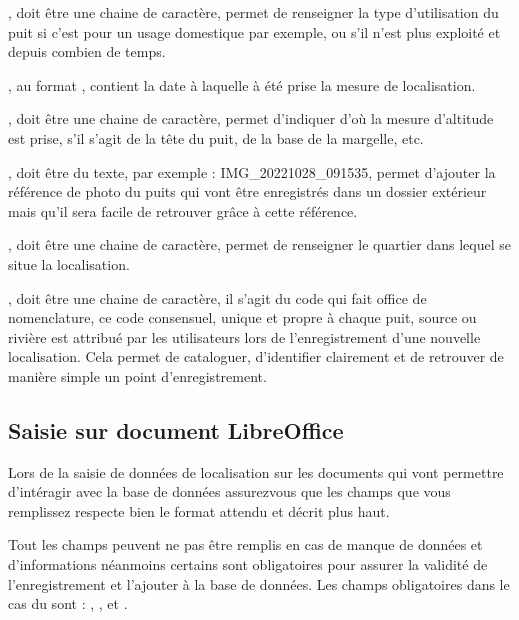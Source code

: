 \documentclass[letterpaper,10pt,french]{sphinxmanual}
\begin{document}
\sphinxAtStartPar
{}, doit être une chaine de caractère, permet de renseigner la type d’utilisation du puit si c’est pour un usage domestique par exemple, ou s’il n’est
plus exploité et depuis combien de temps.

\sphinxAtStartPar
{}, au format , contient la date à laquelle à été prise la mesure de localisation.

\sphinxAtStartPar
{}, doit être une chaine de caractère, permet d’indiquer d’où la mesure d’altitude est prise, s’il s’agit de la tête du puit, de la base de la margelle, etc.

\sphinxAtStartPar
{}, doit être du texte, par exemple : IMG\_20221028\_091535, permet d’ajouter la référence de photo du puits qui vont être enregistrés dans un dossier extérieur mais
qu’il sera facile de retrouver grâce à cette référence.

\sphinxAtStartPar
{}, doit être une chaine de caractère, permet de renseigner le quartier dans lequel se situe la localisation.

\sphinxAtStartPar
{}, doit être une chaine de caractère, il s’agit du code qui fait office de nomenclature, ce code consensuel, unique et propre à chaque puit, source ou rivière est attribué par les utilisateurs
lors de l’enregistrement d’une nouvelle localisation. Cela permet de cataloguer, d’identifier clairement et de retrouver de manière simple un point d’enregistrement.


\subsection{Saisie sur document LibreOffice}
\label{\detokenize{bones:id1}}
\sphinxAtStartPar
Lors de la saisie de données de localisation sur les documents  qui vont permettre d’intéragir avec la base de données assurez\sphinxhyphen{}vous que les champs que vous remplissez
respecte bien le format attendu et décrit plus haut.

\sphinxAtStartPar
Tout les champs peuvent ne pas être remplis en cas de manque de données et d’informations néanmoins certains sont obligatoires
pour assurer la validité de l’enregistrement et l’ajouter à la base de données. Les champs obligatoires dans le cas du   sont : , ,  et .
\end{document}
